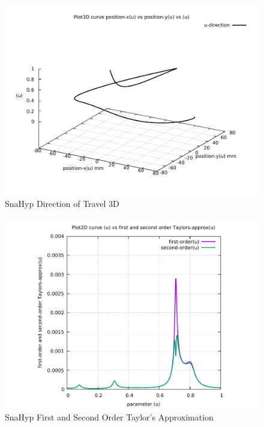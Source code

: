 \begin{figure}
	\caption     {SnaHyp Direction of Travel 3D}
	\label{04-img-SnaHyp Direction of Travel 3D.pdf}
\includegraphics[width=1.00\textwidth]{Chap4/appendix/app-SnaHyp/plots/04-img-SnaHyp Direction of Travel 3D.pdf}
\end{figure}

\clearpage
\pagebreak

\begin{figure}
	\caption     {SnaHyp First and Second Order Taylor's Approximation}
	\label{05-img-SnaHyp-First-and-Second-Order-Taylors-Approx.pdf}
\includegraphics[width=1.00\textwidth]{Chap4/appendix/app-SnaHyp/plots/05-img-SnaHyp-First-and-Second-Order-Taylors-Approx.pdf}
\end{figure}


